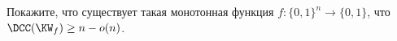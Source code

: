 Покажите, что существует такая монотонная функция $f\colon \{0, 1\}^n \to \{0, 1\}$, что 
$\DCC(\KW_f) \ge n - o(n)$. 